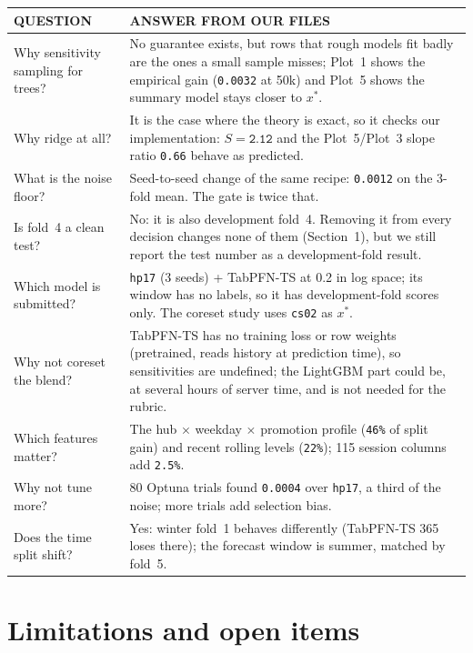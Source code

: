 \documentclass[10pt,a4paper,twocolumn]{article}
\newcommand{\n}[1]{\texttt{#1}}
\newcommand{\code}[1]{\texttt{#1}}
\newcommand{\thh}[1]{{\sffamily\scriptsize\bfseries\color{greytext}\MakeUppercase{#1}}}
\begin{document}
{\footnotesize
\begin{tabularx}{\linewidth}{@{}L{2.6cm} Y@{}}
\toprule
\thh{Question} & \thh{Answer from our files} \\
\midrule
Why sensitivity sampling for trees? & No guarantee exists, but rows that rough models fit badly are the ones a small sample
  misses; Plot~1 shows the empirical gain (\n{0.0032} at 50k) and Plot~5 shows the summary model stays closer to $x^\ast$. \\
Why ridge at all? & It is the case where the theory is exact, so it checks our implementation: $S=\n{2.12}$ and the
  Plot~5/Plot~3 slope ratio \n{0.66} behave as predicted. \\
What is the noise floor? & Seed-to-seed change of the same recipe: \n{0.0012} on the 3-fold mean. The gate is twice that. \\
Is fold~4 a clean test? & No: it is also development fold~4. Removing it from every decision changes none of them
  (Section~1), but we still report the test number as a development-fold result. \\
Which model is submitted? & \code{hp17} (3 seeds) + TabPFN-TS at 0.2 in log space; its window has no labels, so it has
  development-fold scores only. The coreset study uses \code{cs02} as $x^\ast$. \\
Why not coreset the blend? & TabPFN-TS has no training loss or row weights (pretrained, reads history at prediction time), so
  sensitivities are undefined; the LightGBM part could be, at several hours of server time, and is not needed for the rubric. \\
Which features matter? & The hub $\times$ weekday $\times$ promotion profile (\n{46\%} of split gain) and recent rolling levels
  (\n{22\%}); 115 session columns add \n{2.5\%}. \\
Why not tune more? & 80 Optuna trials found \n{0.0004} over \code{hp17}, a third of the noise; more trials add selection bias. \\
Does the time split shift? & Yes: winter fold~1 behaves differently (TabPFN-TS 365 loses there); the forecast window is summer, matched by fold~5. \\
\bottomrule
\end{tabularx}}

\section{Limitations and open items}
\end{document}
